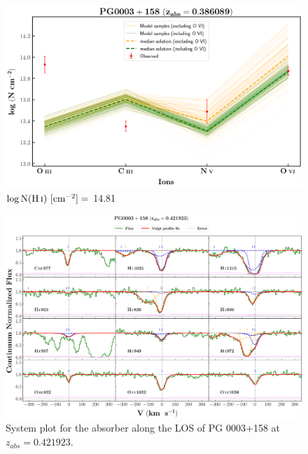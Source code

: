   \begin{figure}[!h]
    \centering
    \includegraphics[width=0.9\linewidth]{Ionisation-Modelling-Plots/pg0003-z=0.386089-compI.png}
      \caption{$\log \text{N}(\ion{H}{i}) \ [\text{cm}^{-2}]=$ 14.81}
  \end{figure}
  
  \restoregeometry
  
  \newpage
  \thispagestyle{empty}
  
  \begin{landscape}
  
      \begin{figure}
      \centering
      \vspace{-10mm}
      \hspace*{-20mm}
      \includegraphics[width=1.1\linewidth]{System-Plots/PG0003+158_z=0.421923_sys_plot.png}
      \caption{System plot for the absorber along the LOS of PG 0003+158 at $z_{abs} = 0.421923$. }
      \end{figure}
      
  \end{landscape}
  
